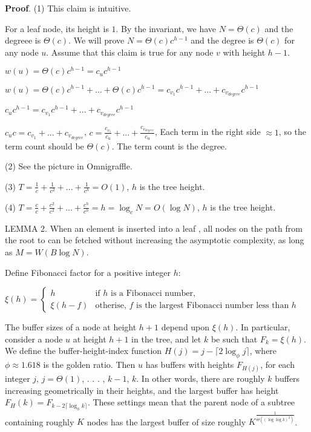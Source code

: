 \documentclass{book}
\begin{document}
\textbf{Proof}.
(1) This claim is intuitive.

For a leaf node, its height is $1$. By the invariant, we have $N=\Theta(c)$ and the degreee is $\Theta(c)$. We will prove $N=\Theta(c) c^{h-1}$ and the degree is $\Theta(c)$ for any node $u$. Assume that this claim is true for any node $v$ with height $h-1$.

$w(u) = \Theta(c) c^{h-1} = c_{u} c^{h-1}$

$w(u) = \Theta(c) c^{h-1} + ... + \Theta(c) c^{h-1} = c_{v_1} c^{h-1} + ... +
c_{v_{degree}}c^{h-1}$

$c_{u} c^{h-1} = c_{v_1} c^{h-1} + ... +  c_{v_{degree}}c^{h-1}$

$c_{u} c = c_{v_1}  + ... +  c_{v_{degree}}$,
$c = \frac{c_{v_1}}{c_u} + ... +  \frac{c_{v_{degree}}}{c_u}$, Each term in the right side $\approx 1$, so the term count should be $\Theta(c)$. The term count is the degree.

(2) See the picture in Omnigraffle.

(3) $T = \frac{1}{c}  + \frac{1}{c^2} + ... + \frac{1}{c^h}=O(1)$, $h$ is the tree height.

(4) $T = \frac{c}{c}  + \frac{c^2}{c^2} + ... + \frac{c^h}{c^h}=h=\log_{c}{N}=O(\log N)$, $h$ is the tree height.


LEMMA 2. When an element is inserted into a leaf , all nodes on the path from the root to  can be fetched without increasing the asymptotic complexity, as long as $M = W(B\log N)$.

Define Fibonacci factor for a positive integer $h$:

$\xi(h) = \begin{cases}
  \displaystyle h & \text{if } h \text{ is a Fibonacci number,} \\
  \displaystyle \xi(h-f) & \text{otherise, } f \text{ is the largest Fibonacci number less than } h
\end{cases}$

The buffer sizes of a node at height $h+1$ depend upon $\xi(h)$. In particular, consider a node $u$ at height $h+1$ in the tree, and let $k$ be such that $F_k = \xi(h)$.  We define the buffer-height-index function $H(j)=j- \lceil 2\log_{\phi} j \rceil$, where $\phi\approx 1.618$ is the golden ratio. Then $u$ has buffers with heights $F_{H( j)}$, for each integer $j$, $j = \Theta(1)$, . . . , $k-1$, $k$.  In other words, there are roughly $k$ buffers increasing geometrically in their heights, and the largest buffer has height $F_H(k) = F_{k-2\lceil  \log_{\phi} k\rceil}$. These settings mean that the parent node of a subtree containing roughly $K$ nodes has the largest buffer of size roughly $K^{\frac{1}{\Theta((\log \log k)^2)}}$.
\end{document}

